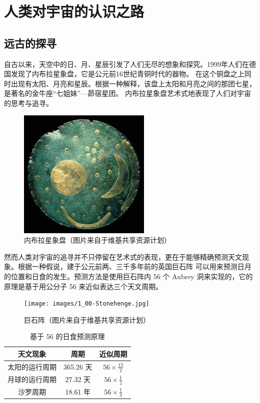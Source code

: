 \documentclass[a4paper,10.5pt]{article}
\begin{document}
\section{人类对宇宙的认识之路}

\subsection{远古的探寻}

自古以来，天空中的日、月、星辰引发了人们无尽的想象和探究。1999年人们在德国发现了内布拉星象盘，它是公元前16世纪青铜时代的器物。
在这个铜盘之上同时出现有太阳、月亮和星辰。根据一种解释，该盘上太阳和月亮之间的那团七星，是著名的金牛座“七姐妹”—昴宿星团。
内布拉星象盘艺术式地表现了人们对宇宙的思考与追寻。

\begin{figure}[ht]
\centering
\includegraphics[width=2.5in]{images/1_01-Nebra_sky_disk.jpg}
\caption{内布拉星象盘（图片来自于维基共享资源计划）}
\end{figure}

然而人类对宇宙的追寻并不只停留在艺术式的表现，更在于能够精确预测天文现象。根据一种假说，建于公元前两、三千多年前的英国巨石阵
可以用来预测日月的位置和日食的发生。预测方法是使用巨石阵内 56 个 Aubrey 洞来实现的，它的原理是基于用公分子 56 来近似表达三个天文周期。

\begin{figure}[ht]
\centering
\texttt{[image: images/1\_00-Stonehenge.jpg]}
\caption{巨石阵（图片来自于维基共享资源计划）}
\end{figure}

\begin{table}[tbhp]
\centering
\begin{tabular}{|c|c|c|}
\hline
天文现象 & 周期 & 近似周期 \\
\hline
太阳的运行周期 & 365.26 天 & $ 56 \times \frac{13}{2} $ \\
\hline
月球的运行周期 & 27.32 天 & $ 56 \times \frac{1}{2} $ \\
\hline
沙罗周期 & 18.61 年 & $ 56 \times \frac{1}{3} $ \\
\hline
\end{tabular}
\caption{基于 56 的日食预测原理}
\end{table}
\end{document}
